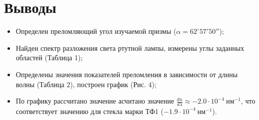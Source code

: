\documentclass[a4paper,12pt]{article}
\begin{document}
\section*{Выводы}
\begin{itemize}
\item Определен преломляющий угол изучаемой призмы ($\alpha = 62^\circ57'50''$);
\item Найден спектр разложения света ртутной лампы, измерены углы заданных областей (Таблица 1);
\item Определены значения показателей преломления в зависимости от длины волны (Таблица 2), построен график (Рис. 4);
\item По графику рассчитано значение асчитано значение $\frac{dn}{d\lambda} \approx -2.0 \cdot 10^{-4}\ \text{нм}^{-1}$, что соответствует значению для стекла марки ТФ1 ($-1.9 \cdot 10^{-4}\ \text{нм}^{-1}$).
\end{itemize}
\end{document}
